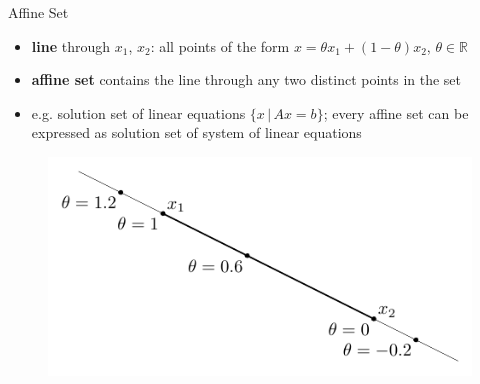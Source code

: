 \documentclass[10pt]{beamer}
\newcommand{\ds}{\displaystyle}
\theoremstyle{definition}
\begin{document}
\begin{frame}{Affine Set}
\begin{itemize}
  \item {\bf line} through $x_1$, $x_2$: all points of the form $\ds x = \theta x_1 + (1 - \theta) x_2$, $\theta\in\mathbb{R}$
  \item {\bf affine set} contains the line through any two distinct points in the set
  \item e.g. solution set of linear equations $\ds\{x\,|\,Ax = b\}$; every affine set can be expressed as solution set of system of linear equations
\end{itemize}

\begin{figure}[!htbp]
  \centering
  \includegraphics[scale=0.75,page=1]{fig/note06/02.pdf}
\end{figure}

\end{frame}
\end{document}
